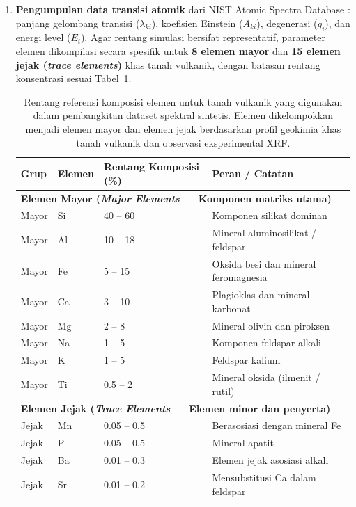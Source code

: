\documentclass[12pt, a4paper]{article}
\begin{document}
\begin{enumerate}[label=\arabic*., leftmargin=2cm]
    \item \textbf{Pengumpulan data transisi atomik} dari NIST Atomic Spectra Database \cite{kramida2024}: panjang gelombang transisi ($\lambda_{ki}$), koefisien Einstein ($A_{ki}$), degenerasi ($g_i$), dan energi level ($E_i$). Agar rentang simulasi bersifat representatif, parameter elemen dikompilasi secara spesifik untuk \textbf{8 elemen mayor} dan \textbf{15 elemen jejak (\textit{trace elements})} khas tanah vulkanik, dengan batasan rentang konsentrasi sesuai Tabel~\ref{tab:komposisi-tanah}.

\begin{table}[htbp]
\centering
\caption{Rentang referensi komposisi elemen untuk tanah vulkanik yang digunakan dalam pembangkitan dataset spektral sintetis. Elemen dikelompokkan menjadi elemen mayor dan elemen jejak berdasarkan profil geokimia khas tanah vulkanik dan observasi eksperimental XRF.}
\label{tab:komposisi-tanah}
\small
\begin{tabular}{lllp{6cm}}
\toprule
\textbf{Grup} & \textbf{Elemen} & \textbf{Rentang Komposisi (\%)} & \textbf{Peran / Catatan} \\
\midrule
\multicolumn{4}{l}{\textbf{Elemen Mayor (\textit{Major Elements} --- Komponen matriks utama)}} \\
Mayor & Si & 40 -- 60 & Komponen silikat dominan \\
Mayor & Al & 10 -- 18 & Mineral aluminosilikat / feldspar \\
Mayor & Fe & 5 -- 15 & Oksida besi dan mineral feromagnesia \\
Mayor & Ca & 3 -- 10 & Plagioklas dan mineral karbonat \\
Mayor & Mg & 2 -- 8 & Mineral olivin dan piroksen \\
Mayor & Na & 1 -- 5 & Komponen feldspar alkali \\
Mayor & K & 1 -- 5 & Feldspar kalium \\
Mayor & Ti & 0.5 -- 2 & Mineral oksida (ilmenit / rutil) \\
\midrule
\multicolumn{4}{l}{\textbf{Elemen Jejak (\textit{Trace Elements} --- Elemen minor dan penyerta)}} \\
Jejak & Mn & 0.05 -- 0.5 & Berasosiasi dengan mineral Fe \\
Jejak & P & 0.05 -- 0.5 & Mineral apatit \\
Jejak & Ba & 0.01 -- 0.3 & Elemen jejak asosiasi alkali \\
Jejak & Sr & 0.01 -- 0.2 & Mensubstitusi Ca dalam feldspar \\

\end{tabular}
\end{table}
\end{enumerate}
\end{document}
